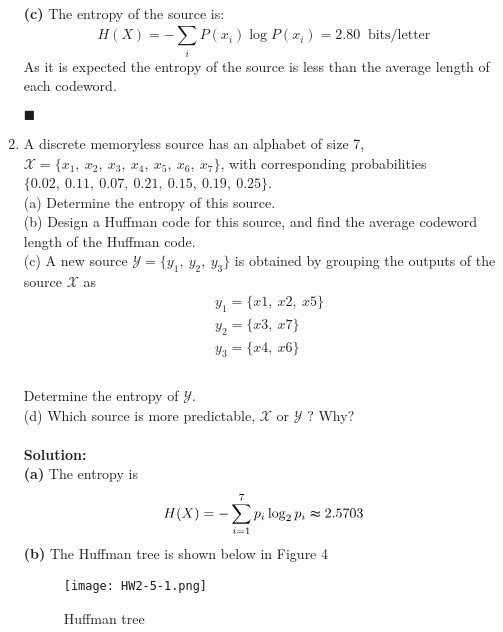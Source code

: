 \documentclass[a4paper,12pt]{article}
\begin{document}
\begin{enumerate}
            \textbf{(c)} 
            The entropy of the source is: $$H(X) = - \sum_{i}^{}P(x_{i}) \log P(x_{i}) = 2.80 \;\; \text{bits/letter}$$
            As it is expected the entropy of the source is less than the average length of each codeword.
            \begin{flushright}
                $\blacksquare$
            \end{flushright}
        \item 
            A discrete memoryless source has an alphabet of size 7, $\mathcal{X} = \{ x_1, \ x_2, \ x_3, \ x_4, \ x_5, \ x_6, \ x_7 \}$, with corresponding probabilities $\{ 0.02, \ 0.11, \ 0.07, \ 0.21, \ 0.15, \ 0.19, \ 0.25 \}$. \\
            (a) Determine the entropy of this source. \\ 
            (b) Design a Huffman code for this source, and find the average codeword length of the Huffman code. \\ 
            (c) A new source $\mathcal{Y} = \{ y_1, \ y_2, \ y_3 \}$ is obtained by grouping the outputs of the source $\mathcal{X}$ as 
            $$ 
            \begin{aligned}
                & y_1 = \{ x1, \ x2, \ x5 \} \\
                & y_2 = \{ x3, \ x7 \} \\ 
                & y_3 = \{ x4, \ x6 \} \\
            \end{aligned}
            $$ \\
            Determine the entropy of $\mathcal{Y}$. \\
            (d) Which source is more predictable, $\mathcal{X}$ or $\mathcal{Y}$ ? Why? \\ \\
            \textbf{Solution:} \\
            \textbf{(a)} 
            The entropy is $$H(X) = - \sum_{i = 1}^{7} p_i \log_2 p_i \thickapprox 2.5703$$
            \textbf{(b)} 
            The Huffman tree is shown below in Figure 4
            \begin{figure}[h]
                \centering
                \texttt{[image: HW2-5-1.png]}
                \caption{Huffman tree}
            \end{figure} \\ 

\end{enumerate}
\end{document}
